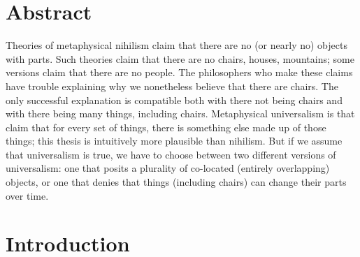 \documentclass[12pt,twoside]{reedfancy}
\begin{document}
\begin{spacing}{1.25}



    \tableofcontents

\chapter*{Abstract}
Theories of metaphysical nihilism claim that there are no (or nearly
no) objects with parts.  Such theories claim that there are no chairs,
houses, mountains; some versions claim that there are no people.  The
philosophers who make these claims have trouble explaining why we
nonetheless believe that there are chairs.  The only successful
explanation is compatible both with there not being chairs and with
there being many things, including chairs.  Metaphysical universalism
is that claim that for every set of things, there is something else
made up of those things; this thesis is intuitively more plausible
than nihilism.  But if we assume that universalism is true, we have to
choose between two different versions of universalism: one that posits
a plurality of co-located (entirely overlapping) objects, or one that
denies that things (including chairs) can change their parts over
time.

\mainmatter %
\pagestyle{fancyplain} %
  
\chapter*{Introduction}



\end{spacing}
\end{document}

